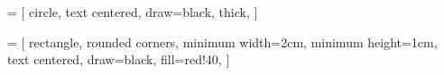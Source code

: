 
\usepackage{multirow}
\usepackage{threeparttable}
\usepackage{booktabs}

\usepackage[margin=3cm]{geometry}

\usepackage[scaled]{helvet}

\usepackage{indentfirst}

\usepackage{multicol}
\usepackage{enumitem}

\usepackage{amsmath}
    \newcommand{\argmin}{\mathop{\mathrm{argmin}}\limits}
    \newcommand{\argmax}{\mathop{\mathrm{argmax}}\limits}
    \DeclareMathOperator{\E}{\mathrm{E}}
    \DeclareMathOperator{\var}{\ensuremath{\sigma^2}}
    \DeclareMathOperator{\cov}{\mathrm{cov}}
    \newcommand{\T}{\top}
    \DeclareMathOperator{\softmax}{\mathrm{softmax}}
\usepackage{amssymb}
\usepackage{bm}

\usepackage{titlesec}
    \titleformat{\section}{\sffamily\bfseries}{$\blacktriangleright$}{1em}{}
    \titleformat{\subsection}{\sffamily\bfseries}{$\triangleright$}{1em}{}


\usepackage{graphicx}
    \graphicspath{{figures/}}
\usepackage{wrapfig}

\usepackage{caption, subcaption}

\usepackage{fancyhdr}

    \usepackage{lastpage}
    \fancyfoot[l]{\today}

    \pagestyle{fancy}

\usepackage[ruled]{algorithm2e}

\usepackage{tikz}
    \usetikzlibrary{shapes, positioning}
     = [
        circle, 
        text centered, 
        draw=black, 
        thick,
    ]

     = [
        rectangle, 
        rounded corners, 
        minimum width=2cm, 
        minimum height=1cm,
        text centered, 
        draw=black, 
        fill=red!40,
    ]

